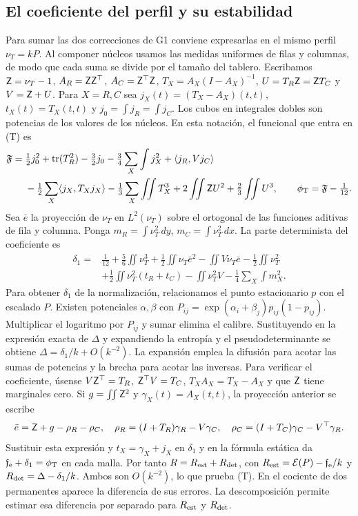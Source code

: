 \subsection{El coeficiente del perfil y su estabilidad}
Para sumar las dos correcciones de G1 conviene expresarlas en el mismo perfil $\nu_T=kP$.
Al componer núcleos usamos las medidas uniformes de filas y columnas, de modo que cada suma
se divide por el tamaño del tablero. Escribamos $\mathsf Z=\nu_T-1$, $A_R=\mathsf Z\mathsf Z^\top$,
 $A_C=\mathsf Z^\top \mathsf Z$,
$T_X=A_X(I-A_X)^{-1}$, $U=T_R\mathsf Z=\mathsf Z{}T_C$ y $V=\mathsf Z+U$. Para $X=R,C$ sea
$j_X(t)=(T_X-A_X)(t,t)$, $t_X(t)=T_X(t,t)$ y $j_0=\int j_R=\int j_C$.
Los cubos en integrales dobles son potencias de los valores de los núcleos. En esta notación,
el funcional que entra en (T) es
\begin{align*}
 \mathfrak F={}&\tfrac12j_0^2+\operatorname{tr}(T_R^2)-\tfrac32 j_0
    -\tfrac34\sum_X\int j_X^2+\langle j_R,V j_C\rangle\\
 &-\tfrac12\sum_X\langle j_X,T_Xj_X\rangle-\tfrac13\sum_X\iint T_X^3
    +2\iint \mathsf Z{}U^2+\tfrac23\iint U^3,\qquad
 \phi_{\mathrm T}=\mathfrak F-\tfrac1{12}.
\end{align*}
Sea $\bar e$ la proyección de $\nu_T$ en $L^2(\nu_T)$ sobre el ortogonal de las funciones
aditivas de fila y columna. Ponga $m_R=\int\nu_T^2\,dy$, $m_C=\int\nu_T^2\,dx$. La parte
determinista del coeficiente es
\begin{align*}
 \delta_1={}&\tfrac1{12}+\tfrac56\iint\nu_T^3+\tfrac12\iint\nu_T\bar e^2
 -\iint V\nu_T\bar e-\tfrac12\iint\nu_T^2\\
 &+\tfrac12\iint\nu_T^2(t_R+t_C)-\iint\nu_T^2V-\tfrac14\sum_X\int m_X^2 .
\end{align*}
Para obtener $\delta_1$ de la normalización, relacionamos el punto estacionario $p$ con el
escalado $P$. Existen potenciales $\alpha,\beta$ con
$P_{ij}=\exp(\alpha_i+\beta_j)p_{ij}(1-p_{ij})$. Multiplicar el logaritmo por $P_{ij}$
y sumar elimina el calibre. Sustituyendo en la expresión exacta de $\Delta$ y expandiendo
la entropía y el pseudodeterminante se obtiene $\Delta=\delta_1/k+O(k^{-2})$.
La expansión emplea la difusión para acotar las sumas de potencias y la brecha para
acotar las inversas. Para verificar el coeficiente, úsense $V \mathsf Z^\top=T_R$, $\mathsf Z^\top V=T_C$,
$T_X A_X=T_X-A_X$ y que $\mathsf Z$ tiene marginales cero. Si $g=\iint \mathsf Z^2$ y
$\gamma_X(t)=A_X(t,t)$, la proyección anterior se escribe
\[
 \bar e=\mathsf Z+g-\rho_R-\rho_C,\quad
 \rho_R=(I+T_R)\gamma_R-V\gamma_C,\quad
 \rho_C=(I+T_C)\gamma_C-V^\top\gamma_R .
\]
Sustituir esta expresión y $t_X=\gamma_X+j_X$ en $\delta_1$ y en la fórmula estática da
$\mathfrak f_{\rm e}+\delta_1=\phi_{\mathrm T}$ en cada malla. Por tanto
$R=R_{\rm est}+R_{\rm det}$, con $R_{\rm est}=\mathcal E(P)-\mathfrak f_{\rm e}/k$ y
$R_{\rm det}=\Delta-\delta_1/k$. Ambos son $O(k^{-2})$, lo que prueba (T). En el cociente de
dos permanentes aparece la diferencia de sus errores. La descomposición permite estimar esa
diferencia por separado para $R_{\rm est}$ y $R_{\rm det}$.


